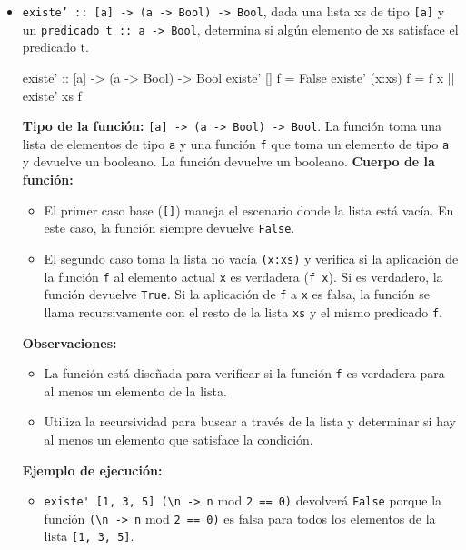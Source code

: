 \documentclass{article}
\begin{document}
\begin{itemize}
    \item 
\verb|existe’ :: [a] -> (a -> Bool) -> Bool|, dada una lista xs de tipo \verb|[a]| y un \verb|predicado t :: a -> Bool|, determina si algún elemento de xs satisface el predicado t.
\begin{haskell}
existe' :: [a] -> (a -> Bool) -> Bool
existe' [] f = False
existe' (x:xs) f = f x || existe' xs f
\end{haskell}
\textbf{Tipo de la función:} \verb|[a] -> (a -> Bool) -> Bool|. La función toma una lista de elementos de tipo \verb|a| y una función \verb|f| que toma un elemento de tipo \verb|a| y devuelve un booleano. La función devuelve un booleano.
\textbf{Cuerpo de la función:}
\begin{itemize}
\item El primer caso base (\verb|[]|) maneja el escenario donde la lista está vacía. En este caso, la función siempre devuelve \verb|False|.
\item El segundo caso toma la lista no vacía \verb|(x:xs)| y verifica si la aplicación de la función \verb|f| al elemento actual \verb|x| es verdadera (\verb|f x|). Si es verdadero, la función devuelve \verb|True|. Si la aplicación de \verb|f| a \verb|x| es falsa, la función se llama recursivamente con el resto de la lista \verb|xs| y el mismo predicado \verb|f|.
\end{itemize}
\textbf{Observaciones:}
\begin{itemize}
\item La función está diseñada para verificar si la función \verb|f| es verdadera para al menos un elemento de la lista.
\item Utiliza la recursividad para buscar a través de la lista y determinar si hay al menos un elemento que satisface la condición.
\end{itemize}
\textbf{Ejemplo de ejecución:}
\begin{itemize}
\item \verb|existe' [1, 3, 5] (\n -> n| mod \verb|2 == 0)| devolverá \verb|False| porque la función \verb|(\n -> n| mod \verb|2 == 0)| es falsa para todos los elementos de la lista \verb|[1, 3, 5]|.
\end{itemize}


\end{itemize}
\end{document}
